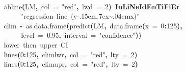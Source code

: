 \documentclass[a4paper]{article}
\newcommand{\hlnumber}[1]{\textcolor[rgb]{0.0823529411764706,0.0784313725490196,0.709803921568627}{#1}}%
\newcommand{\hlfunctioncall}[1]{\textcolor[rgb]{1,0,0}{#1}}%
\newcommand{\hlstring}[1]{\textcolor[rgb]{0.6,0.6,1}{#1}}%
\newcommand{\hlkeyword}[1]{\textcolor[rgb]{0,0,0}{\textbf{#1}}}%
\newcommand{\hlargument}[1]{\textcolor[rgb]{0.694117647058824,0.247058823529412,0.0196078431372549}{#1}}%
\newcommand{\hlcomment}[1]{\textcolor[rgb]{0.8,0.8,0.8}{#1}}%
\newcommand{\hlassignement}[1]{\textcolor[rgb]{0.215686274509804,0.215686274509804,0.384313725490196}{\textbf{#1}}}%
\newcommand{\hlsymbol}[1]{\textcolor[rgb]{0,0,0}{#1}}%
\newcommand{\hlprompt}[1]{\textcolor[rgb]{0,0,0}{#1}}%
\def\urltilda{\kern -.15em\lower .7ex\hbox{\~{}}\kern .04em}%
\newcommand{\hlstd}[1]{\textcolor[rgb]{0,0,0}{#1}}%
\newenvironment{Houtput}{\raggedright}{%
%
}
\begin{document}
\begin{Houtput}
\normalfont
\hspace*{\fill}\\
\hlstd{}\ttfamily\noindent
\hlprompt{\usebox{\hlnormalsizeboxgreaterthan}{\ }}\hlfunctioncall{abline}\hlkeyword{(}\hlsymbol{LM}\hlkeyword{,}{\ }\hlargument{col}{\ }\hlargument{=}{\ }\hlstring{"red"}\hlkeyword{,}{\ }\hlargument{lwd}{\ }\hlargument{=}{\ }\hlnumber{2}\hlkeyword{)}{\ }\hlkeyword{\usebox{\hlnormalsizeboxpercent}InLiNe\usebox{\hlnormalsizeboxunderscore}IdEnTiFiEr\usebox{\hlnormalsizeboxpercent}}\hspace*{\fill}\\
\hlstd{}\hlprompt{{\ }}{\ }{\ }{\ }{\ }\hlstring{"\usebox{\hlnormalsizeboxhash}{\ }regression{\ }line{\ }(y\urltilda{}x)"}\mbox{}
\normalfont
\hspace*{\fill}\\
\hlstd{}\ttfamily\noindent
\hlprompt{\usebox{\hlnormalsizeboxgreaterthan}{\ }}\hlsymbol{clim}{\ }\hlassignement{\usebox{\hlnormalsizeboxlessthan}-}{\ }\hlfunctioncall{as.data.frame}\hlkeyword{(}\hlfunctioncall{predict}\hlkeyword{(}\hlsymbol{LM}\hlkeyword{,}{\ }\hlfunctioncall{data.frame}\hlkeyword{(}\hlargument{x}{\ }\hlargument{=}{\ }\hlnumber{0}\hlkeyword{:}\hlnumber{125}\hlkeyword{)}\hlkeyword{,}\hspace*{\fill}\\
\hlstd{}\hlprompt{{\ }}{\ }{\ }{\ }{\ }\hlargument{level}{\ }\hlargument{=}{\ }\hlnumber{0.95}\hlkeyword{,}{\ }\hlargument{interval}{\ }\hlargument{=}{\ }\hlstring{"confidence"}\hlkeyword{)}\hlkeyword{)}\mbox{}
\normalfont
\hspace*{\fill}\\
\hlstd{}\ttfamily\noindent
\hlprompt{\usebox{\hlnormalsizeboxgreaterthan}{\ }}\hlcomment{\usebox{\hlnormalsizeboxhash}{\ }lower{\ }then{\ }upper{\ }CI}\mbox{}
\normalfont
\hspace*{\fill}\\
\hlstd{}\ttfamily\noindent
\hlprompt{\usebox{\hlnormalsizeboxgreaterthan}{\ }}\hlfunctioncall{lines}\hlkeyword{(}\hlnumber{0}\hlkeyword{:}\hlnumber{125}\hlkeyword{,}{\ }\hlsymbol{clim}\hlkeyword{\usebox{\hlnormalsizeboxdollar}}\hlsymbol{lwr}\hlkeyword{,}{\ }\hlargument{col}{\ }\hlargument{=}{\ }\hlstring{"red"}\hlkeyword{,}{\ }\hlargument{lty}{\ }\hlargument{=}{\ }\hlnumber{2}\hlkeyword{)}\mbox{}
\normalfont
\hspace*{\fill}\\
\hlstd{}\ttfamily\noindent
\hlprompt{\usebox{\hlnormalsizeboxgreaterthan}{\ }}\hlfunctioncall{lines}\hlkeyword{(}\hlnumber{0}\hlkeyword{:}\hlnumber{125}\hlkeyword{,}{\ }\hlsymbol{clim}\hlkeyword{\usebox{\hlnormalsizeboxdollar}}\hlsymbol{upr}\hlkeyword{,}{\ }\hlargument{col}{\ }\hlargument{=}{\ }\hlstring{"red"}\hlkeyword{,}{\ }\hlargument{lty}{\ }\hlargument{=}{\ }\hlnumber{2}\hlkeyword{)}\mbox{}
\normalfont
\hspace*{\fill}\\
\hlstd{}
\end{Houtput}
{\tikzexternaldisable

}
\end{document}
